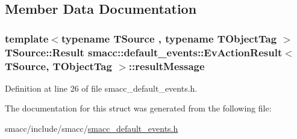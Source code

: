 \subsection{Member Data Documentation}
\subsubsection[{\texorpdfstring{result\+Message}{resultMessage}}]{\setlength{\rightskip}{0pt plus 5cm}template$<$typename T\+Source , typename T\+Object\+Tag $>$ T\+Source\+::\+Result {\bf smacc\+::default\+\_\+events\+::\+Ev\+Action\+Result}$<$ T\+Source, T\+Object\+Tag $>$\+::result\+Message}\hypertarget{structsmacc_1_1default__events_1_1EvActionResult_a446603e4d43ded6c16a7abba1bf8bfcd}{}\label{structsmacc_1_1default__events_1_1EvActionResult_a446603e4d43ded6c16a7abba1bf8bfcd}


Definition at line 26 of file smacc\+\_\+default\+\_\+events.\+h.



The documentation for this struct was generated from the following file\+:\begin{DoxyCompactItemize}
\item 
smacc/include/smacc/\hyperlink{smacc__default__events_8h}{smacc\+\_\+default\+\_\+events.\+h}\end{DoxyCompactItemize}
